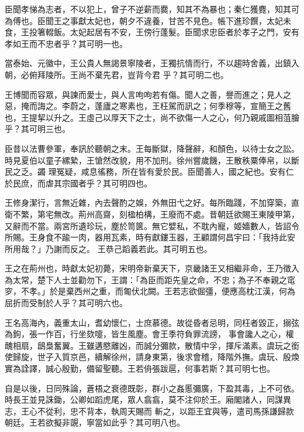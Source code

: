 \begin{pinyinscope}
 臣聞孝悌為志者，不以犯上，曾子不逆薪而爨，知其不為暴也；秦仁獲麑，知其可為傅也。臣聞王之事獻太妃也，朝夕不違養，甘苦不見色。帳下進珍饌，太妃未食，王投箸輟飯。太妃起居有不安，王傍行蓬髮。臣聞求忠臣者於孝子之門，安有孝如王而不忠者乎？其可明一也。



 當泰始、元徽中，王公貴人無謁景寧陵者，王獨抗情而行，不以趨時舍義，出鎮入朝，必俯拜陵所。王尚不棄先君，豈背今君
 乎？其可明二也。



 王博聞而容眾，與諫而愛士，與人言呴呴若有傷。聞人之善，譽而進之；見人之惡，掩而誨之。李蔚之，蓬廬之寒素也，王枉駕而訊之；何季穆等，宣簡王之舊也，王提挈以升之。王虛己以厚天下之士，尚不欲傷一人之心，何乃親戚圖相菹膾乎？其可明三也。



 臣昔以法曹參軍，奉訊於聽朝之末。王每斷獄，降聲辭，和顏色，以待士女之訟。時見夏伯以童子縲縶，王愴然改貌，用不加刑。徐州嘗歲饑，王散秩粟俸帛，以斷民之乏。蠲
 理冤疑，咸息徭務，所在皆有愛於民。臣聞善人，國之紀也。安有仁於民庶，而虐其宗國者乎？其可明四也。



 王修身潔行，言無近雜，內去聲酌之娛，外無田弋之好。每所臨踐，不加穿築，直衛不繁，第宅無改。荊州高齋，刻楹柏構，王廢而不處。昔朝廷欲賜王東陵甲第，又辭而不當。兩宮所遺珍玩，塵於笥篋。無它嬖私，不耽內寵，姬嬙數人，皆詔令所賜。王身食不踰一肉，器用瓦素，時有獻鏤玉器，王顧謂何昌宇曰：「我持此安所用哉？」乃謝而反之。
 王恭己蹈義若此。其可明五也。



 王之在荊州也，時獻太妃初薨，宋明帝新棄天下，京畿諸王又相繼非命，王乃徵入為太常，楚下人士並勸勿下，王謂：「為臣而距先皇之命，不忠；為子不奉親之窀穸，不孝。」於是棄西州之重，而匍伏北闕。王若志欲倔彊，便應高枕江漢，何為屈折而受制於人乎？其可明六也。



 王名高海內，義重太山，耆幼懷仁，士庶慕德。故從昏者忌明，同枉者毀正，搦弦為鉤，張一作百，行坐欬嚏，皆生風塵。會王季符負罪流謗，
 事會讒人之心，權醜相扇，鴟梟奮翼。王雖遘愍離凶，而誠分彌款，散情中孚，揮斥滿素。虞玩之銜使歸旋，世子入質京邑，續解徐州，請身東第，後求會稽，降階外撫。虞玩、殷煥實為詮譯，誠心殷勤，備留聖聽。王若侜張跋扈，何事若斯？其可明七也。



 自是以後，日同殊論，蒼梧之衰德既彰，群小之姦慝彌廣，下盈其毒，上不可依。時長王並見誅鋤，公卿如蹈虎尾，眾人翕翕，莫不注仰於王。廂閣諸人，同謀異志，王心不從利，忠不背本，執周天賜而
 斬之，以距王宜與等，遣司馬孫謙歸款朝廷。王若欲擬非覬，寧當如此乎？其可明八也。




\end{pinyinscope}
